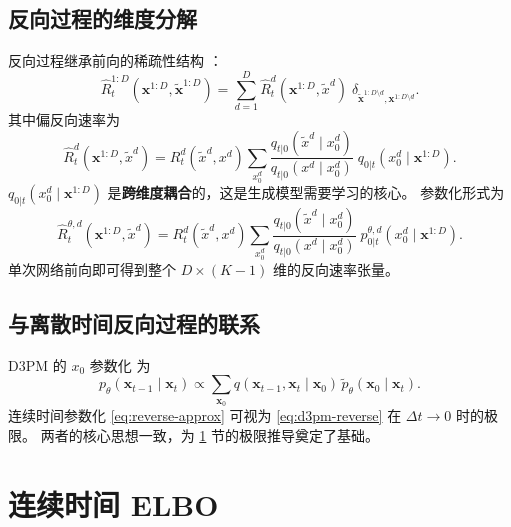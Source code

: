 \documentclass[12pt,a4paper]{ctexbook}
\theoremstyle{definition}
\begin{document}
\subsection{反向过程的维度分解}
\label{sec:reverse-dim-decomp}

反向过程继承前向的稀疏性结构 \cite[§4.2 Proposition 3]{campbell2022ctmc}：
\begin{equation}
\hat{R}_t^{1:D}(\boldsymbol{x}^{1:D}, \tilde{\boldsymbol{x}}^{1:D}) = \sum_{d=1}^D \hat{R}_t^d(\boldsymbol{x}^{1:D}, \tilde{x}^d) \;\delta_{\tilde{\boldsymbol{x}}^{1:D \setminus d}, \boldsymbol{x}^{1:D \setminus d}}. \label{eq:reverse-dim-decomp}
\end{equation}
其中偏反向速率为
\begin{equation}
\hat{R}_t^d(\boldsymbol{x}^{1:D}, \tilde{x}^d) = R_t^d(\tilde{x}^d, x^d) \sum_{x_0^d} \frac{q_{t|0}(\tilde{x}^d \mid x_0^d)}{q_{t|0}(x^d \mid x_0^d)} \; q_{0|t}(x_0^d \mid \boldsymbol{x}^{1:D}). \label{eq:reverse-dim-rate}
\end{equation}
$q_{0|t}(x_0^d \mid \boldsymbol{x}^{1:D})$ 是\textbf{跨维度耦合}的，这是生成模型需要学习的核心。
参数化形式为
\begin{equation}
\hat{R}_t^{\theta,d}(\boldsymbol{x}^{1:D}, \tilde{x}^d) = R_t^d(\tilde{x}^d, x^d) \sum_{x_0^d} \frac{q_{t|0}(\tilde{x}^d \mid x_0^d)}{q_{t|0}(x^d \mid x_0^d)} \; p_{0|t}^{\theta,d}(x_0^d \mid \boldsymbol{x}^{1:D}). \label{eq:reverse-dim-param}
\end{equation}
单次网络前向即可得到整个 $D \times (K-1)$ 维的反向速率张量。

\subsection{与离散时间反向过程的联系}

D3PM 的 $x_0$ 参数化 \cite[§2]{austin2021d3pm} 为
\begin{equation}
p_\theta(\boldsymbol{x}_{t-1} \mid \boldsymbol{x}_t) \propto \sum_{\boldsymbol{x}_0} q(\boldsymbol{x}_{t-1}, \boldsymbol{x}_t \mid \boldsymbol{x}_0) \, \tilde{p}_\theta(\boldsymbol{x}_0 \mid \boldsymbol{x}_t). \label{eq:d3pm-reverse}
\end{equation}
连续时间参数化 \eqref{eq:reverse-approx} 可视为 \eqref{eq:d3pm-reverse} 在 $\Delta t \to 0$ 时的极限。
两者的核心思想一致，为 \ref{sec:elbo} 节的极限推导奠定了基础。

\section{连续时间 ELBO}
\label{sec:elbo}
\end{document}
